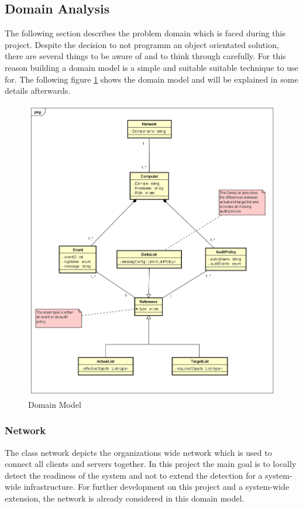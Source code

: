\clearpage

\subsection{Domain Analysis}
The following section describes the problem domain which is faced during this project. Despite the decision to not programm an object orientated solution, there are several things to be aware of and to think through carefully. For this reason building a domain model is a simple and  suitable  suitable technique to use for. The following figure \ref{fig:domainmodel} shows the domain model and will be explained in some details afterwards. 
\begin{figure}[H]
    \centering
    \includegraphics[width=0.95\linewidth]{assets/architecture/DomainModelSRI.png}
    \caption{Domain Model}\label{fig:domainmodel}
\end{figure}

\subsubsection{Network}
The class network depicts the organizations wide network which is used to connect all clients and servers together. In this project the main goal is to locally detect the readiness of the system and not to extend the detection for a system-wide infrastructure. For further development on this project and a system-wide extension, the network is already considered in this domain model.

